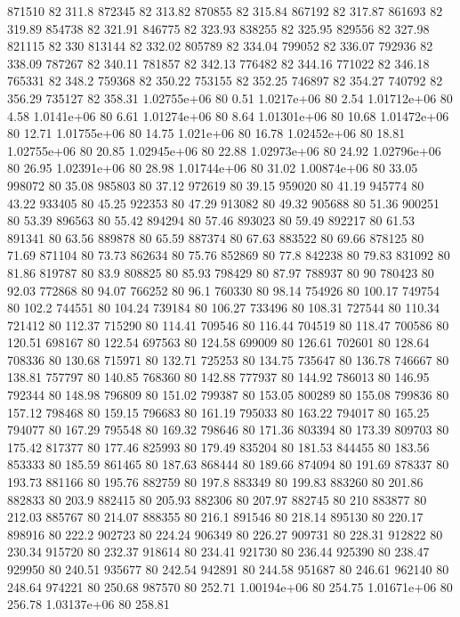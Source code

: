 871510 82 311.8
872345 82 313.82
870855 82 315.84
867192 82 317.87
861693 82 319.89
854738 82 321.91
846775 82 323.93
838255 82 325.95
829556 82 327.98
821115 82 330
813144 82 332.02
805789 82 334.04
799052 82 336.07
792936 82 338.09
787267 82 340.11
781857 82 342.13
776482 82 344.16
771022 82 346.18
765331 82 348.2
759368 82 350.22
753155 82 352.25
746897 82 354.27
740792 82 356.29
735127 82 358.31
1.02755e+06 80 0.51
1.0217e+06 80 2.54
1.01712e+06 80 4.58
1.0141e+06 80 6.61
1.01274e+06 80 8.64
1.01301e+06 80 10.68
1.01472e+06 80 12.71
1.01755e+06 80 14.75
1.021e+06 80 16.78
1.02452e+06 80 18.81
1.02755e+06 80 20.85
1.02945e+06 80 22.88
1.02973e+06 80 24.92
1.02796e+06 80 26.95
1.02391e+06 80 28.98
1.01744e+06 80 31.02
1.00874e+06 80 33.05
998072 80 35.08
985803 80 37.12
972619 80 39.15
959020 80 41.19
945774 80 43.22
933405 80 45.25
922353 80 47.29
913082 80 49.32
905688 80 51.36
900251 80 53.39
896563 80 55.42
894294 80 57.46
893023 80 59.49
892217 80 61.53
891341 80 63.56
889878 80 65.59
887374 80 67.63
883522 80 69.66
878125 80 71.69
871104 80 73.73
862634 80 75.76
852869 80 77.8
842238 80 79.83
831092 80 81.86
819787 80 83.9
808825 80 85.93
798429 80 87.97
788937 80 90
780423 80 92.03
772868 80 94.07
766252 80 96.1
760330 80 98.14
754926 80 100.17
749754 80 102.2
744551 80 104.24
739184 80 106.27
733496 80 108.31
727544 80 110.34
721412 80 112.37
715290 80 114.41
709546 80 116.44
704519 80 118.47
700586 80 120.51
698167 80 122.54
697563 80 124.58
699009 80 126.61
702601 80 128.64
708336 80 130.68
715971 80 132.71
725253 80 134.75
735647 80 136.78
746667 80 138.81
757797 80 140.85
768360 80 142.88
777937 80 144.92
786013 80 146.95
792344 80 148.98
796809 80 151.02
799387 80 153.05
800289 80 155.08
799836 80 157.12
798468 80 159.15
796683 80 161.19
795033 80 163.22
794017 80 165.25
794077 80 167.29
795548 80 169.32
798646 80 171.36
803394 80 173.39
809703 80 175.42
817377 80 177.46
825993 80 179.49
835204 80 181.53
844455 80 183.56
853333 80 185.59
861465 80 187.63
868444 80 189.66
874094 80 191.69
878337 80 193.73
881166 80 195.76
882759 80 197.8
883349 80 199.83
883260 80 201.86
882833 80 203.9
882415 80 205.93
882306 80 207.97
882745 80 210
883877 80 212.03
885767 80 214.07
888355 80 216.1
891546 80 218.14
895130 80 220.17
898916 80 222.2
902723 80 224.24
906349 80 226.27
909731 80 228.31
912822 80 230.34
915720 80 232.37
918614 80 234.41
921730 80 236.44
925390 80 238.47
929950 80 240.51
935677 80 242.54
942891 80 244.58
951687 80 246.61
962140 80 248.64
974221 80 250.68
987570 80 252.71
1.00194e+06 80 254.75
1.01671e+06 80 256.78
1.03137e+06 80 258.81
